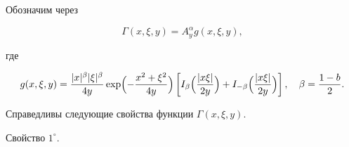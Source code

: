 \smallskip



Обозначим через 

\begin{equation}\label{Formula_G}

\Gamma(x,\xi,y)=A_{y}^{\alpha} g(x,\xi,y), 

\end{equation}

где

\begin{equation}\label{Formula_g}

g(x,\xi,y)=\frac{ |x|^{\beta} |\xi|^{\beta}}{4y} \exp \Bigl({-\frac{x^2+\xi^2}{4y}}\Bigr)

\left[I_{\beta}\Bigl(\frac{|x\xi|}{2y} \Bigr)+I_{-\beta}\Bigl(\frac{|x\xi|}{2y} \Bigr) \right],\quad 

\beta=\frac{1-b}{2}.

\end{equation}




Справедливы следующие свойства функции $\Gamma(x,\xi,y).$



\smallskip

\hypertarget{sv1o}{}

{\small \sc Свойство  $1^\circ.$}

